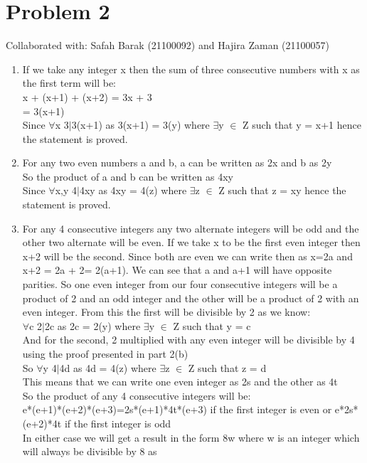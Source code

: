 \documentclass{article}
\begin{document}
\section{Problem 2}
Collaborated with: Safah Barak (21100092) and Hajira Zaman (21100057)
\begin{enumerate}
\item %
If we take any integer x then the sum of three consecutive numbers with x as the first term will be: \\
x + (x+1) + (x+2) = 3x + 3 \\ = 3(x+1)\\
Since $\forall$x 3$|$3(x+1) as 3(x+1) = 3(y) where $\exists$y $\in$ Z such that y = x+1 hence the statement is proved.
\item %
For any two even numbers a and b, a can be written as 2x and b as 2y\\
So the product of a and b can be written as 4xy \\
Since $\forall$x,y 4$|$4xy as 4xy = 4(z) where $\exists$z $\in$ Z such that z = xy hence the statement is proved.
\item %
For any 4 consecutive integers any two alternate integers will be odd and the other two alternate will be even. If we take x to be the first even integer then x+2 will be the second. Since both are even we can write then as x=2a and x+2 = 2a + 2= 2(a+1). We can see that a and a+1 will have opposite parities. So one even integer from our four consecutive integers will be a product of 2 and an odd integer and the other will be a product of 2 with an even integer. From this the first will be divisible by 2 as we know: \\
$\forall$c 2$|$2c as 2c = 2(y) where $\exists$y $\in$ Z such that y = c\\
And for the second, 2 multiplied with any even integer will be divisible by 4 using the proof presented in part 2(b) \\
So $\forall$y 4$|$4d as 4d = 4(z) where $\exists$z $\in$ Z such that z = d \\
This means that we can write one even integer as 2s and the other as 4t\\
So the product of any 4 consecutive integers will be:\\
e*(e+1)*(e+2)*(e+3)=2s*(e+1)*4t*(e+3) if the first integer is even or e*2s*(e+2)*4t if the first integer is odd\\
In either case we will get a result in the form 8w where w is an integer which will always be divisible by 8 as \\

\end{enumerate}
\end{document}
